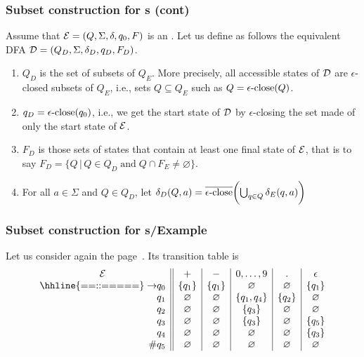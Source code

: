 %
\begin{frame}
\frametitle{Subset construction for {\eNFA}s (cont)}

Assume that \({\cal E} = (Q, \Sigma, \delta, q_0, F)\) is an
\eNFA. Let us define as follows the equivalent DFA \({\cal D} = (Q_D,
\Sigma, \delta_D, q_D, F_D)\).
\begin{enumerate}

  \item \(Q_D\) is the set of subsets of \(Q_E\). More precisely, all
  accessible states of \(\cal D\) are \(\epsilon\)-closed subsets of
  \(Q_E\), i.e., sets \(Q \subseteq Q_E\) such as \(Q = \epsilon\text{-close}(Q)\).

  \item \(q_D = \epsilon\text{-close} (q_0)\), i.e., we get the start state
  of \(\cal D\) by \(\epsilon\)-closing the set made of only the start
  state of \(\cal E\).

  \item \(F_D\) is those sets of states that contain at least one
  final state of \(\cal E\), that is to say \(F_D = \{Q \, \lvert
  \, Q \in Q_D \; \text{and} \; Q \cap F_E \neq \varnothing\}\).

  \item For all \(a \in \Sigma\) and \(Q \in Q_D\), let
  \(
  \delta_D (Q, a) = \overline{\epsilon\text{-close}} \biggl(\bigcup_{q \in Q}{\delta_E (q,
    a)}\biggr)
  \)

 \end{enumerate}

\end{frame}

%
\begin{frame}
\frametitle{Subset construction for {\eNFA}s/Example}

Let us consider again the \eNFA page~\pageref{enfa_num}. Its transition
table is
\[
\begin{array}{r@{}l||c|c|c|c|c}
\multicolumn{2}{c||}{\cal E} & + & - & 0, \ldots, 9 & \mathtt{.} &
\epsilon\\
\hhline{==::=====}
\rightarrow & q_0 & \{q_1\} & \{q_1\} & \varnothing & \varnothing
                  & \{q_1\}\\
            & q_1 & \varnothing  & \varnothing & \{q_1, q_4\}
                  & \{q_2\} & \varnothing\\
            & q_2 & \varnothing  & \varnothing & \{q_3\} & \varnothing
                  & \varnothing\\
            & q_3 & \varnothing & \varnothing & \{q_3\} & \varnothing
                  & \{q_5\}\\
            & q_4 & \varnothing & \varnothing & \varnothing
                  & \varnothing & \{q_3\}\\
         \# & q_5 & \varnothing & \varnothing & \varnothing
                  & \varnothing & \varnothing
\end{array}
\]

\end{frame}

